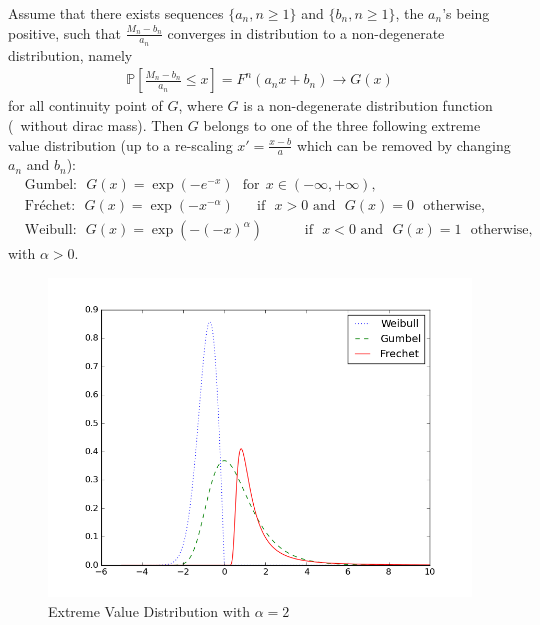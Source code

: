 \begin{theorem}
\label{thm:univariate-evt}
Assume that there exists sequences
$\{a_n, n \ge 1\}$ and $\{b_n, n \ge 1\}$, the $a_n$'s being positive, such that $\frac{M_n-b_n}{a_n} $ converges in distribution to a non-degenerate distribution, namely
\begin{align}
\label{eq:hyp-GEV}
\mathbb{P}\left[ \frac{M_n-b_n}{a_n} \le x \right] = F^n(a_n x + b_n) \to G(x)
\end{align}
for all continuity point of $G$, where $G$ is a non-degenerate distribution function (\ie~without dirac mass).
Then $G$ belongs to one of the three following extreme value distribution (up to a re-scaling $x' = \frac{x-b}{a}$ which can be removed by changing $a_n$ and $b_n$):
\begin{align*}
&\text{Gumbel:}~~~  G(x) = \exp \left( -e^{-x} \right)~~~\text{for}~~ x \in (-\infty, +\infty),\\
&\text{Fréchet:}~~~ G(x) = \exp \left(-x^{-\alpha}\right) ~~~\text{~~~if~~} x > 0 \text{~and~~} G(x)=0 \text{~~otherwise},\\
&\text{Weibull:}~~~G(x) = \exp \left(-(-x)^{\alpha}\right) ~~~~~~~~~\text{~~~if~~} x < 0 \text{~and~~} G(x)=1 \text{~~otherwise},
\end{align*}
with $\alpha>0$.
\end{theorem}
\begin{figure}[!ht]
  \centering
  \includegraphics[width=.9\linewidth]{fig_source/GEV.png}
  \caption{Extreme Value Distribution with $\alpha = 2$}
  \label{fig:GEV}
\end{figure}

